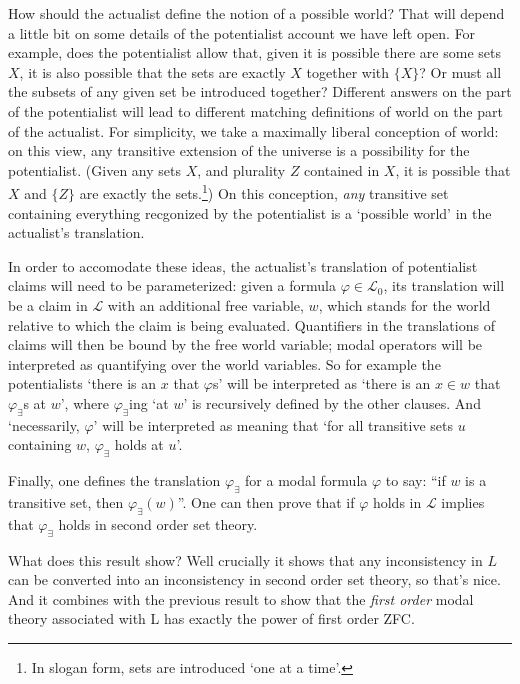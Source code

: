 \documentclass{article}
\begin{document}
How should the actualist define the notion of a possible world? That will depend a 
little bit on some details of the potentialist account we have left open. For example, 
does the potentialist allow that, given it is possible there are some sets $X$, it is also 
possible that the sets are exactly $X$ together with $\{X\}$? Or must 
all the subsets of any given set be introduced together? Different answers on the 
part of the potentialist will lead to different matching definitions of world on 
the part of the actualist. For simplicity, we take a maximally liberal conception of 
world: on this view, any transitive extension of the universe is a possibility for the 
potentialist. (Given any sets $X$, and plurality $Z$ contained in $X$, it is possible 
that $X$ and $\{Z\}$ are exactly the sets.\footnote{
    In slogan form, sets are introduced `one at a time'.}) On this conception, \emph{any}
transitive set containing everything recgonized by the potentialist is a `possible world'
in the actualist's translation.

In order to accomodate these ideas, the actualist's translation of potentialist claims 
will need to be parameterized: given a formula $\varphi \in \mathcal{L}_0$, its 
translation will be a claim in $\mathcal{L}$ with an additional free variable, $w$, 
which stands for the world relative to which the claim is being evaluated. Quantifiers 
in the translations of claims will then be bound by the free world variable; 
modal operators will be interpreted as quantifying over the world variables. So for
example the potentialists `there is an $x$ that $\varphi$s' will be interpreted as 
`there is an $x \in w$ that $\varphi_\exists$s at $w$', where $\varphi_\exists$ing `at $w$' is recursively 
defined by the other clauses. And `necessarily, $\varphi$' will be interpreted as meaning 
that `for all transitive sets $u$ containing $w$, $\varphi_\exists$ holds at $u$'.

Finally, one defines the translation $\varphi_\exists$ for a modal formula $\varphi$ 
to say: ``if $w$ is a transitive set, then $\varphi_\exists(w)$''.
One can then prove that if $\varphi$ holds in $\mathcal{L}$ implies that 
$\varphi_\exists$ holds in second order set theory.

What does this result show? Well crucially it shows that any inconsistency in 
$L$ can be converted into an inconsistency in second order set theory, 
so that's nice. And it combines with the previous result to show that the 
\emph{first order} modal theory associated with L has exactly the power 
of first order ZFC.
\end{document}
